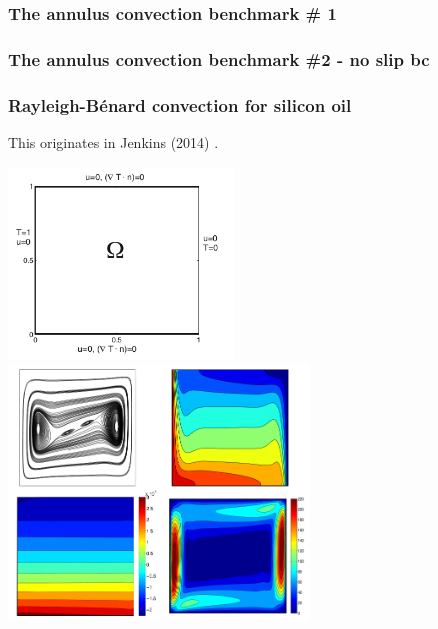\newpage
\subsubsection{The annulus convection benchmark \# 1} \label{ss:anconv}










\newpage
\subsubsection{The annulus convection benchmark \#2 - no slip bc} \label{ss:anconv2}





\subsubsection{Rayleigh-B{\'e}nard convection for silicon oil}

This originates in Jenkins \etal (2014) \cite{jejl14}.

\begin{center}
\includegraphics[width=6cm]{images/benchmark_jejl14/jejl14a}
\includegraphics[width=8cm]{images/benchmark_jejl14/jejl14b}
\end{center}

